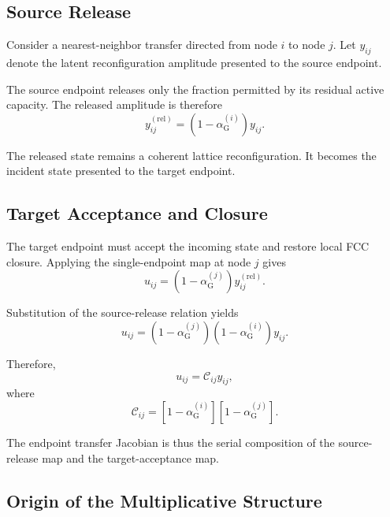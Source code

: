 \subsection{Source Release}

Consider a nearest-neighbor transfer directed from node $i$ to node $j$. Let $y_{ij}$ denote the latent reconfiguration amplitude presented to the source endpoint.

The source endpoint releases only the fraction permitted by its residual active capacity. The released amplitude is therefore
\begin{equation}
    y_{ij}^{(\mathrm{rel})} = \left( 1-\alpha_{\mathrm{G}}^{(i)} \right) y_{ij}.
\end{equation}

The released state remains a coherent lattice reconfiguration. It becomes the incident state presented to the target endpoint.

\subsection{Target Acceptance and Closure}

The target endpoint must accept the incoming state and restore local FCC closure. Applying the single-endpoint map at node $j$ gives
\begin{equation}
    u_{ij} = \left( 1-\alpha_{\mathrm{G}}^{(j)} \right) y_{ij}^{(\mathrm{rel})}.
\end{equation}

Substitution of the source-release relation yields
\begin{equation}
    u_{ij} = \left( 1-\alpha_{\mathrm{G}}^{(j)} \right) \left( 1-\alpha_{\mathrm{G}}^{(i)} \right) y_{ij}.
\end{equation}

Therefore,
\begin{equation}
    \boxed{ u_{ij} = \mathcal{C}_{ij}y_{ij} },
\end{equation}
where
\begin{equation}
    \boxed{ \mathcal{C}_{ij} = \left[ 1-\alpha_{\mathrm{G}}^{(i)} \right] \left[ 1-\alpha_{\mathrm{G}}^{(j)} \right] }.
\end{equation}

The endpoint transfer Jacobian is thus the serial composition of the source-release map and the target-acceptance map.

\subsection{Origin of the Multiplicative Structure}

